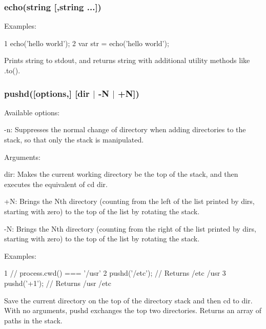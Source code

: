 \subsubsection*{echo(string \mbox{[},string ...\mbox{]})}

Examples\+:


\begin{DoxyCode}
1 echo('hello world');
2 var str = echo('hello world');
\end{DoxyCode}


Prints string to stdout, and returns string with additional utility methods like {\ttfamily .to()}.

\subsubsection*{pushd(\mbox{[}options,\mbox{]} \mbox{[}dir $\vert$ \textquotesingle{}-\/\+N\textquotesingle{} $\vert$ \textquotesingle{}+\+N\textquotesingle{}\mbox{]})}

Available options\+:


\begin{DoxyItemize}
\item {\ttfamily -\/n}\+: Suppresses the normal change of directory when adding directories to the stack, so that only the stack is manipulated.
\end{DoxyItemize}

Arguments\+:


\begin{DoxyItemize}
\item {\ttfamily dir}\+: Makes the current working directory be the top of the stack, and then executes the equivalent of {\ttfamily cd dir}.
\item {\ttfamily +\+N}\+: Brings the Nth directory (counting from the left of the list printed by dirs, starting with zero) to the top of the list by rotating the stack.
\item {\ttfamily -\/\+N}\+: Brings the Nth directory (counting from the right of the list printed by dirs, starting with zero) to the top of the list by rotating the stack.
\end{DoxyItemize}

Examples\+:


\begin{DoxyCode}
1 // process.cwd() === '/usr'
2 pushd('/etc'); // Returns /etc /usr
3 pushd('+1');   // Returns /usr /etc
\end{DoxyCode}


Save the current directory on the top of the directory stack and then cd to {\ttfamily dir}. With no arguments, pushd exchanges the top two directories. Returns an array of paths in the stack.

